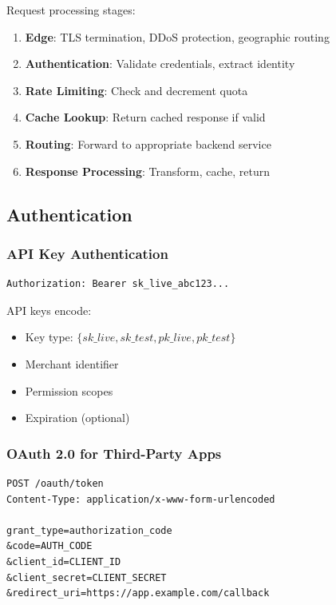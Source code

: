 \documentclass[11pt,a4paper]{article}
\begin{document}
Request processing stages:

\begin{enumerate}
    \item \textbf{Edge}: TLS termination, DDoS protection, geographic routing
    \item \textbf{Authentication}: Validate credentials, extract identity
    \item \textbf{Rate Limiting}: Check and decrement quota
    \item \textbf{Cache Lookup}: Return cached response if valid
    \item \textbf{Routing}: Forward to appropriate backend service
    \item \textbf{Response Processing}: Transform, cache, return
\end{enumerate}

\subsection{Authentication}

\subsubsection{API Key Authentication}

\begin{lstlisting}[caption=API Key Header]
Authorization: Bearer sk_live_abc123...
\end{lstlisting}

API keys encode:
\begin{itemize}
    \item Key type: $\{sk\_live, sk\_test, pk\_live, pk\_test\}$
    \item Merchant identifier
    \item Permission scopes
    \item Expiration (optional)
\end{itemize}

\subsubsection{OAuth 2.0 for Third-Party Apps}

\begin{lstlisting}[caption=OAuth Token Request]
POST /oauth/token
Content-Type: application/x-www-form-urlencoded

grant_type=authorization_code
&code=AUTH_CODE
&client_id=CLIENT_ID
&client_secret=CLIENT_SECRET
&redirect_uri=https://app.example.com/callback
\end{lstlisting}
\end{document}
